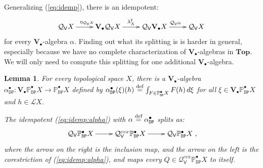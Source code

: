 \documentclass[preprint,12pt]{elsarticle}
\newcommand\eqdef{\mathrel{\buildrel \text{def}\over=}}
\newcommand\Lform{\mathcal L}
\newcommand\Pred{\mathbb{P}}
\newcommand\Demon{{\mathtt{D}}}
\newcommand\Nature{{\mathtt{P}}}
\newcommand\DN{{\Demon\Nature}}
\newcommand\Smyth{{\mathcal Q}}
\newcommand\Vt{\mathsf{V}}
\newcommand\SV{\Smyth_{\Vt}}
\newcommand\Val{{\mathbf V}}
\newcommand\Topcat{\mathbf{Top}}
\newtheorem{lemma}[theorem]{Lemma}
\begin{document}
Generalizing (\ref{eq:idemp}), there is an idempotent:
\begin{equation}
  \label{eq:idemp:alpha}
  \xymatrix{
    \SV X \ar[r]^{\eta_{\SV X}}
    & \Val_\bullet {\SV X}
    \ar[r]^{\lambda^\sharp_X}
    & \SV {\Val_\bullet X}
    \ar[r]^{\SV \alpha}
    & \SV X
  }
\end{equation}
for every $\Val_\bullet$-algebra $\alpha$.  Finding out what its
splitting is is harder in general, especially because we have no
complete characterization of $\Val_\bullet$-algebras in $\Topcat$.  We
will only need to compute this splitting for one additional
$\Val_\bullet$-algebra.
\begin{lemma}
  \label{lemma:idemp:P}
  For every topological space $X$, there is a $\Val_\bullet$-algebra
  $\alpha_\DN^\bullet \colon \allowbreak \Val_\bullet
  {\Pred_\DN^\bullet X} \to \Pred_\DN^\bullet X$ defined by
  $\alpha_\DN^\bullet (\xi) (h) \eqdef \int_{F \in \Pred_\DN^\bullet
    X} F (h) \,d\xi$ for all
  $\xi \in \Val_\bullet {\Pred_\DN^\bullet X}$ and $h \in \Lform X$.

  The idempotent (\ref{eq:idemp:alpha}) with
  $\alpha \eqdef \alpha_\DN^\bullet$ splits as:
  \begin{align*}
    \xymatrix{\SV {\Pred_\DN^\bullet X} \ar[r]
    & \SV^{cvx} {\Pred_\DN^\bullet X} \ar[r] & \SV {\Pred_\DN^\bullet X}},
  \end{align*}
  where the arrow on the right is the inclusion map, and the arrow on
  the left is the corestriction of (\ref{eq:idemp:alpha}), and maps
  every $Q \in \SV^{cvx} {\Pred_\DN^\bullet X}$ to itself.
\end{lemma}
\end{document}
